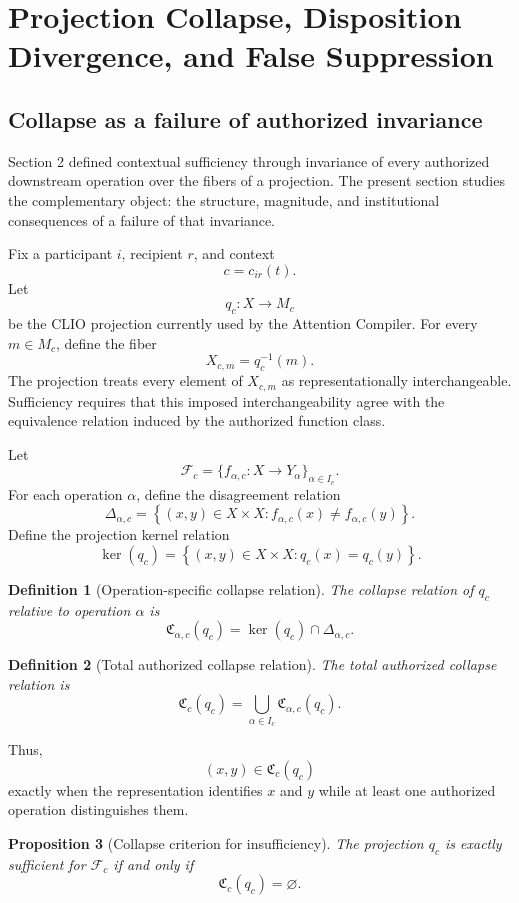 \documentclass[11pt]{article}
\newtheorem{definition}{Definition}[section]
\newtheorem{proposition}[definition]{Proposition}
\theoremstyle{definition}
\newcommand{\F}{\mathcal{F}}
\begin{document}
\section{Projection Collapse, Disposition Divergence, and False Suppression}

\subsection{Collapse as a failure of authorized invariance}

Section 2 defined contextual sufficiency through invariance of every authorized downstream operation over the fibers of a projection. The present section studies the complementary object: the structure, magnitude, and institutional consequences of a failure of that invariance.

Fix a participant \(i\), recipient \(r\), and context
\[
c=c_{ir}(t).
\]
Let
\[
q_c:X\to M_c
\]
be the CLIO projection currently used by the Attention Compiler. For every \(m\in M_c\), define the fiber
\[
X_{c,m}
=
q_c^{-1}(m).
\]
The projection treats every element of \(X_{c,m}\) as representationally interchangeable. Sufficiency requires that this imposed interchangeability agree with the equivalence relation induced by the authorized function class.

Let
\[
\F_c
=
\{f_{\alpha,c}:X\to Y_\alpha\}_{\alpha\in I_c}.
\]
For each operation \(\alpha\), define the disagreement relation
\[
\Delta_{\alpha,c}
=
\left\{
(x,y)\in X\times X:
f_{\alpha,c}(x)\neq f_{\alpha,c}(y)
\right\}.
\]
Define the projection kernel relation
\[
\ker(q_c)
=
\left\{
(x,y)\in X\times X:
q_c(x)=q_c(y)
\right\}.
\]

\begin{definition}[Operation-specific collapse relation]
The collapse relation of \(q_c\) relative to operation \(\alpha\) is
\[
\mathfrak C_{\alpha,c}(q_c)
=
\ker(q_c)\cap\Delta_{\alpha,c}.
\]
\end{definition}

\begin{definition}[Total authorized collapse relation]
The total authorized collapse relation is
\[
\mathfrak C_c(q_c)
=
\bigcup_{\alpha\in I_c}
\mathfrak C_{\alpha,c}(q_c).
\]
\end{definition}

Thus,
\[
(x,y)\in\mathfrak C_c(q_c)
\]
exactly when the representation identifies \(x\) and \(y\) while at least one authorized operation distinguishes them.

\begin{proposition}[Collapse criterion for insufficiency]
The projection \(q_c\) is exactly sufficient for \(\F_c\) if and only if
\[
\mathfrak C_c(q_c)=\varnothing.
\]
\end{proposition}
\end{document}
